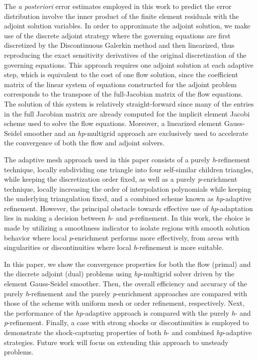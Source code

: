 \documentclass{report}
\begin{document}
The \textit{a posteriori} error estimates employed in this work to predict the error
distribution involve the inner product of the finite element residuals with
the adjoint solution variables.
In order to approximate the adjoint solution,
we make use of the discrete adjoint strategy \cite{Mavriplis::06_1}
where the governing equations are first
discretized by the Discontinuous Galerkin method and then linearized,
thus reproducing the
exact sensitivity derivatives of the original discretization of the governing equations.
This approach requires one adjoint solution at each adaptive step, which
is equivalent to the cost
of one flow solution, since the coefficient matrix of the linear system of equations
constructed for the adjoint problem corresponds to the transpose
of the full-Jacobian matrix of the flow equations.
The solution of this system is relatively
straight-forward since many of the entries in the full Jacobian matrix
are already computed for the implicit element Jacobi scheme used to solve
the flow equations.
Moreover,
a linearized element Gauss-Seidel smoother and an \textit{hp}-multigrid
approach \cite{Nastase::05_1,Wang::07_1} are exclusively
used to accelerate the convergence of both the flow and adjoint solvers.

The adaptive mesh approach used in this paper consists of a purely \textit{h}-refinement
technique, locally subdividing one triangle into four self-similar
children triangles, while keeping
the discretization order fixed, as well as a purely \textit{p}-enrichment
technique, locally increasing
the order of interpolation polynomials while keeping the underlying triangulation fixed,
and a combined scheme known as \textit{hp}-adaptive refinement.
However, the principal obstacle towards effective use of \textit{hp}-adaptation
lies in making a decision between \textit{h}- and \textit{p}-refinement.
In this work, the choice is made by utilizing a smoothness
indicator to isolate regions with smooth solution behavior where local
\textit{p}-enrichment
performs more effectively, from areas with singularities or discontinuities where local
\textit{h}-refinement is more suitable.

In this paper, we show the convergence properties for both the flow
(primal) and the discrete adjoint (dual)
problems using \textit{hp}-multigrid solver driven by the element Gauss-Seidel smoother.
Then, the overall efficiency and accuracy of the purely
\textit{h}-refinement and the purely
\textit{p}-enrichment approaches are compared with those of the scheme
with uniform mesh or order refinement, respectively.
Next, the performance of the \textit{hp}-adaptive approach is compared with the purely
\textit{h}- and \textit{p}-refinement. Finally, a case with strong shocks
or discontinuities is
employed to demonstrate the shock-capturing properties of both \textit{h}- and
combined \textit{hp}-adaptive strategies. Future work will focus on
extending this approach
to unsteady problems.
\end{document}
